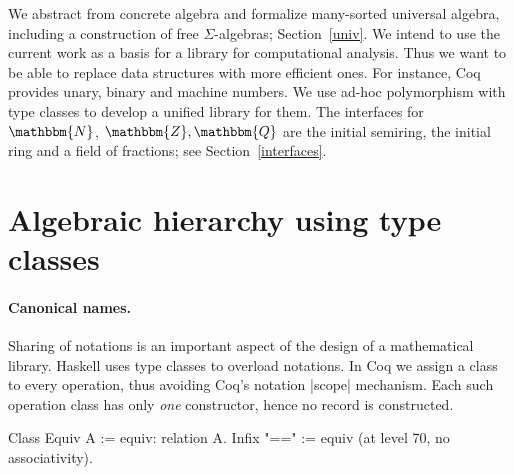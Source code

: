 \documentclass{llncs}
\newcommand{\N}{\ensuremath{\mathbbm{N}}}
\newcommand{\Z}{\ensuremath{\mathbbm{Z}}}
\newcommand{\Q}{\ensuremath{\mathbbm{Q}}}
\begin{document}

We abstract from concrete algebra and formalize many-sorted universal algebra, including a construction of
free $\Sigma$-algebras; Section~\ref{univ}. We intend to use the current work as a basis for
a library for computational analysis.  Thus we want to be able to replace data structures
with more efficient ones. For instance, Coq provides unary, binary and machine numbers. We
use ad-hoc polymorphism with type classes to develop a unified library for them. The interfaces for
$\N$, $\Z,\Q$ are the initial semiring, the initial ring and a field of fractions; see
Section~\ref{interfaces}.


\section{Algebraic hierarchy using type classes}\label{classes}
\vspace*{-2ex}
\paragraph{Canonical names.}\label{names}
Sharing of notations is an important aspect of the design of a mathematical library. Haskell uses
type classes to overload notations. In Coq we assign a class to every operation, thus avoiding Coq's notation |scope| mechanism.
 Each such operation class has only \emph{one} constructor, hence no record is constructed.
\begin{code}
 Class Equiv A := equiv: relation A.
 Infix "==" := equiv (at level 70, no associativity).
\end{code}
\vspace*{-5ex}
\end{document}
